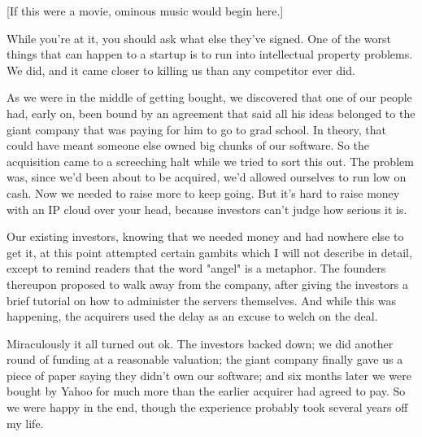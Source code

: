 [If this were a movie, ominous music
                    would begin here.]

While you're at it, you should
                    ask what else they've signed. One of the worst things that
                    can happen to a startup is to run into intellectual property
                    problems. We did, and it came closer to killing us than any
                    competitor ever did.

As we were in the middle of
                    getting bought, we discovered that one of our people had,
                    early on, been bound by an agreement that said all his ideas
                    belonged to the giant company that was paying for him to go
                    to grad school. In theory, that could have meant someone
                    else owned big chunks of our software. So the acquisition
                    came to a screeching halt while we tried to sort this out.
                    The problem was, since we'd been about to be acquired, we'd
                    allowed ourselves to run low on cash. Now we needed to raise
                    more to keep going. But it's hard to raise money with an IP
                    cloud over your head, because investors can't judge how
                    serious it is.

Our existing investors, knowing
                    that we needed money and had nowhere else to get it, at this
                    point attempted certain gambits which I will not describe in
                    detail, except to remind readers that the word "angel" is a
                    metaphor. The founders thereupon proposed to walk away from
                    the company, after giving the investors a brief tutorial on
                    how to administer the servers themselves. And while this was
                    happening, the acquirers used the delay as an excuse to
                    welch on the deal.

Miraculously it all turned out
                    ok. The investors backed down; we did another round of
                    funding at a reasonable valuation; the giant company finally
                    gave us a piece of paper saying they didn't own our
                    software; and six months later we were bought by Yahoo for
                    much more than the earlier acquirer had agreed to pay. So we
                    were happy in the end, though the experience probably took
                    several years off my life.

